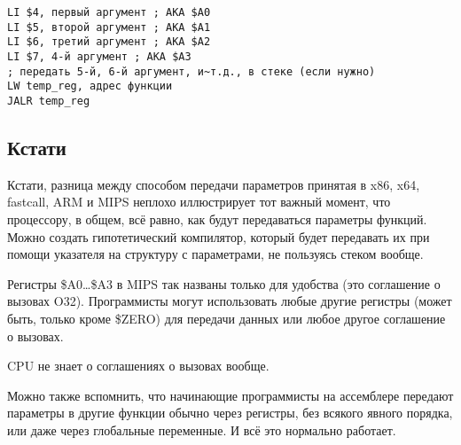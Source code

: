 \begin{lstlisting}[caption=MIPS (соглашение о вызовах O32)]
LI $4, первый аргумент ; AKA $A0
LI $5, второй аргумент ; AKA $A1
LI $6, третий аргумент ; AKA $A2
LI $7, 4-й аргумент ; AKA $A3
; передать 5-й, 6-й аргумент, и~т.д., в стеке (если нужно)
LW temp_reg, адрес функции
JALR temp_reg
\end{lstlisting}

\subsection{Кстати}

Кстати, разница между способом передачи параметров принятая в x86, x64, fastcall, ARM и MIPS неплохо иллюстрирует тот важный момент, что процессору, в общем, всё равно, как будут 
передаваться параметры функций. Можно создать гипотетический компилятор, который будет передавать их при 
помощи указателя на структуру с параметрами, не пользуясь стеком вообще.

Регистры \$A0\dots \$A3 в MIPS так названы только для удобства (это соглашение о вызовах O32).
Программисты могут использовать любые другие регистры (может быть, только кроме \$ZERO) для
передачи данных или любое другое соглашение о вызовах.

\ac{CPU} не знает о соглашениях о вызовах вообще.

Можно также вспомнить, что начинающие программисты на ассемблере передают параметры 
в другие функции обычно через регистры, без всякого явного порядка, или даже через глобальные переменные.
И всё это нормально работает.

